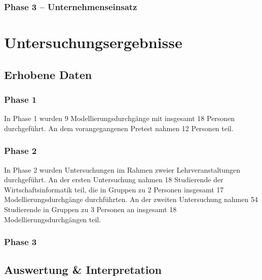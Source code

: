 
\subsection{Phase 3 – Unternehmenseinsatz} %
\label{sub:phase_3_unternehmenseinsatz}



\chapter{Untersuchungsergebnisse} %
\label{cha:untersuchungsergebnisse}

\section{Erhobene Daten} %
\label{sec:erhobene_daten}

\subsection{Phase 1} %
\label{sub:phase_1}

In Phase 1 wurden 9 Modellierungsdurchgänge mit insgesamt 18 Personen durchgeführt. An dem vorangegangenen Pretest nahmen 12 Personen teil.

\subsection{Phase 2} %
\label{sub:phase_2}

In Phase 2 wurden Untersuchungen im Rahmen zweier Lehrveranstaltungen durchgeführt. An der ersten Untersuchung nahmen 18 Studierende der Wirtschaftsinformatik teil, die in Gruppen zu 2 Personen insgesamt 17 Modellierungsdurchgänge durchführten. An der zweiten Untersuchung nahmen 54 Studierende in Gruppen zu 3 Personen an insgesamt 18 Modellierungsdurchgängen teil.

\subsection{Phase 3} %
\label{sub:phase_3}


\section{Auswertung \& Interpretation} %
\label{sec:auswertung_&_interpretation}

